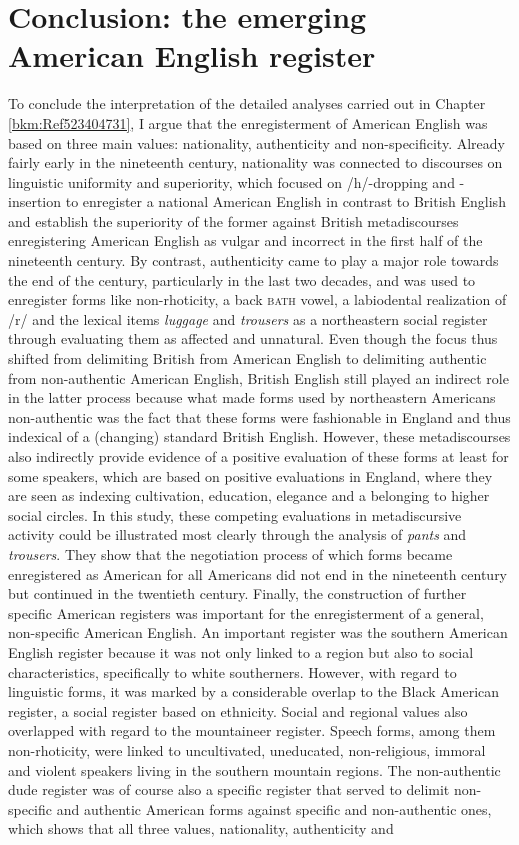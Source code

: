 \section{Conclusion: the emerging American English register}
\hypertarget{Toc63021250}{}
To conclude the interpretation of the detailed analyses carried out in Chapter \ref{bkm:Ref523404731}, I argue that the enregisterment of American English was based on three main values: nationality, authenticity and non-specificity. Already fairly early in the nineteenth century, nationality was connected to discourses on linguistic uniformity and superiority, which focused on /h/-dropping and -insertion to enregister a national American English in contrast to British English and establish the superiority of the former against British metadiscourses enregistering American English as vulgar and incorrect in the first half of the nineteenth century. By contrast, authenticity came to play a major role towards the end of the century, particularly in the last two decades, and was used to enregister forms like non-rhoticity, a back \textsc{bath} vowel, a labiodental realization of /r/ and the lexical items \emph{luggage} and \emph{trousers} as a northeastern social register through evaluating them as affected and unnatural. Even though the focus thus shifted from delimiting British from American English to delimiting authentic from non-authentic American English, British English still played an indirect role in the latter process because what made forms used by northeastern Americans non-authentic was the fact that these forms were fashionable in England and thus indexical of a (changing) standard British English. However, these metadiscourses also indirectly provide evidence of a positive evaluation of these forms at least for some speakers, which are based on positive evaluations in England, where they are seen as indexing cultivation, education, elegance and a belonging to higher social circles. In this study, these competing evaluations in metadiscursive activity could be illustrated most clearly through the analysis of \emph{pants} and \emph{trousers}. They show that the negotiation process of which forms became enregistered as American for all Americans did not end in the nineteenth century but continued in the twentieth century. Finally, the construction of further specific American registers was important for the enregisterment of a general, non-specific American English. An important register was the southern American English register because it was not only linked to a region but also to social characteristics, specifically to white southerners. However, with regard to linguistic forms, it was marked by a considerable overlap to the Black American register, a social register based on ethnicity. Social and regional values also overlapped with regard to the mountaineer register. Speech forms, among them non-rhoticity, were linked to uncultivated, uneducated, non-religious, immoral and violent speakers living in the southern mountain regions. The non-authentic dude register was of course also a specific register that served to delimit non-specific and authentic American forms against specific and non-authentic ones, which shows that all three values, nationality, authenticity and 